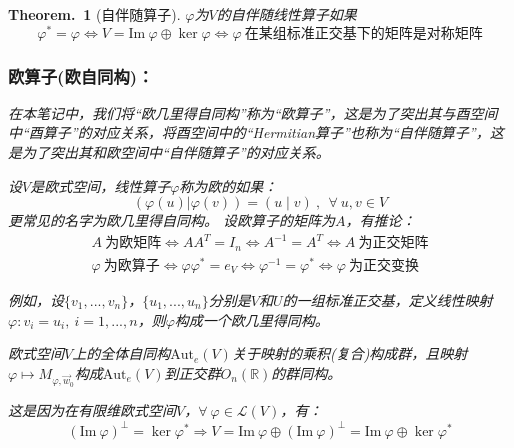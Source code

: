 \documentclass[zihao=5,UTF8]{report}
\theoremstyle{mystyle} %
\newtheorem{theorem}{Theorem.\,}
\begin{document}
\begin{theorem}[自伴随算子]
    
    $\varphi$为$V$的自伴随线性算子如果
    \begin{equation*}
        \varphi^* = \varphi \Longleftrightarrow V = \text{Im}\ \varphi \oplus \ker \varphi \Longleftrightarrow \varphi\ \text{在某组标准正交基下的矩阵是对称矩阵}    
\end{equation*}
    

\subsubsection{欧算子(欧自同构)：}
{\par\color{gray}\small
在本笔记中，我们将“欧几里得自同构”称为“欧算子”，这是为了突出其与酉空间中“酉算子”的对应关系，将酉空间中的“Hermitian算子”也称为“自伴随算子”，这是为了突出其和欧空间中“自伴随算子”的对应关系。
\par}
设$V$是欧式空间，线性算子$\varphi$称为欧的如果：
\begin{equation*}
    \left(\varphi(u) | \varphi(v)\right) = (u\mid v)\ ,\ \ \forall\ u,v \in V
\end{equation*}
更常见的名字为欧几里得自同构。
设欧算子的矩阵为$A$，有推论：
\begin{gather*}
    A\ \text{为欧矩阵} \Longleftrightarrow AA^T = I_n \Longleftrightarrow A^{-1} = A^T \Longleftrightarrow A \ \text{为正交矩阵}\\
    \varphi\ \text{为欧算子} \Longleftrightarrow \varphi\varphi^* = e_V \Longleftrightarrow \varphi^{-1} = \varphi^*  \Longleftrightarrow \varphi \ \text{为正交变换}
\end{gather*}\par
{\par\color{gray}\small 例如，设$\{v_1,...,v_n\}$，$\{u_1,...,u_n\}$分别是$V$和$U$的一组标准正交基，定义线性映射$\varphi:v_i = u_i,\ i = 1,...,n$，则$\varphi$构成一个欧几里得同构。}\par
{\color{gray}\small 欧式空间$V$上的全体自同构$\text{Aut}_e(V)$关于映射的乘积(复合)构成群，且映射$\varphi \longmapsto M_{\varphi, \vec{w}_0}$构成$\text{Aut}_e(V)$到正交群$O_n(\mathbb{R})$的群同构。}

{\par\color{gray}\small
这是因为在有限维欧式空间$V$，$\forall\ \varphi \in \mathscr{L}(V)$，有：
\begin{equation*}
    (\text{Im}\ \varphi)^{\perp} = \ker \varphi^* \Longrightarrow V = \text{Im}\ \varphi \oplus (\text{Im}\ \varphi)^{\perp}= \text{Im}\ \varphi \oplus \ker \varphi^*
\end{equation*}
\par}
\end{theorem}
\end{document}
